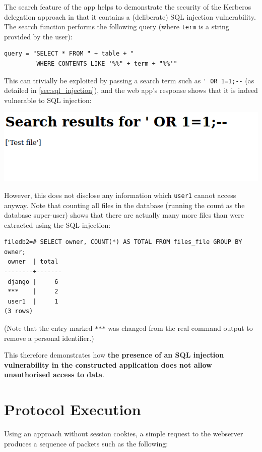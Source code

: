 \documentclass[12pt]{report}
\begin{document}
The search feature of the app helps to demonstrate the security of the Kerberos delegation approach in that it contains a (deliberate) SQL injection vulnerability. The search function performs the following query (where \texttt{term} is a string provided by the user):

\begin{verbatim}
query = "SELECT * FROM " + table + "
         WHERE CONTENTS LIKE '%%" + term + "%%'"
\end{verbatim}

This can trivially be exploited by passing a search term such as \verb+' OR 1=1;--+ (as detailed in \autoref{sec:sql_injection}), and the web app's response shows that it is indeed vulnerable to SQL injection:

\begin{center}
  \includegraphics[scale=0.5]{08-browser4-sql.png}
\end{center}

However, this does not disclose any information which \texttt{user1} cannot access anyway. Note that counting all files in the database (running the count as the database super-user) shows that there are actually many more files than were extracted using the SQL injection:

\begin{verbatim}
filedb2=# SELECT owner, COUNT(*) AS TOTAL FROM files_file GROUP BY owner;
 owner  | total
--------+-------
 django |     6
 ***    |     2
 user1  |     1
(3 rows)
\end{verbatim}

(Note that the entry marked \verb+***+ was changed from the real command output to remove a personal identifier.)

This therefore demonstrates how \textbf{the presence of an SQL injection vulnerability in the constructed application does not allow unauthorised access to data}.

\section{Protocol Execution}
\label{sec:protocol_execution}
Using an approach without session cookies, a simple request to the webserver produces a sequence of packets such as the following:
\end{document}
